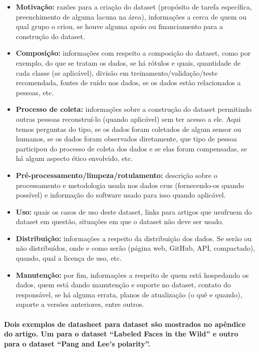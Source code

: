 \documentclass[a4paper]{article}    %
\begin{document}
\begin{itemize}
    \setlength\itemsep{0mm}
    \item \textbf{Motivação:} razões para a criação do dataset (propósito de tarefa específica, preenchimento de alguma lacuna na área), informações a cerca de quem ou qual grupo o criou, se houve alguma apoio ou financiamento para a construção do dataset.
    \item \textbf{Composição:} informações com respeito a composição do dataset, como por exemplo, do que se tratam os dados, se há rótulos e quais, quantidade de cada classe (se aplicável), divisão em treinamento/validação/teste recomendada, fontes de ruído nos dados, se os dados estão relacionados a pessoas, etc.
    \item \textbf{Processo de coleta:} informações sobre a construção do dataset permitindo outras pessoas reconstruí-lo (quando aplicável) sem ter acesso a ele. Aqui temos perguntas do tipo, se os dados foram coletados de algum sensor ou humanos, se os dados foram observados diretamente, que tipo de pessoa participou do processo de coleta dos dados e se elas foram compensadas, se há algum aspecto ético envolvido, etc.
    \item \textbf{Pré-processamento/limpeza/rotulamento:} descrição sobre o processamento e metodologia usada nos dados crus (fornecendo-os quando possível) e informação do software usado para isso quando aplicável.
    \item \textbf{Uso:} quais os casos de uso deste dataset, links para artigos que usufruem do dataset em questão, situações em que o dataset não deve ser usado.
    \item \textbf{Distribuição:} informações a respeito da distribuição dos dados. Se serão ou não distribuídos, onde e como serão (página web, GitHub, API, compactado), quando, qual a licença de uso, etc.
    \item \textbf{Manutenção:} por fim, informações a respeito de quem está hospedando os dados, quem está dando manutenção e suporte no dataset, contato do responsável, se há alguma errata, planos de atualização (o quê e quando), suporte a versões anteriores, entre outros.
\end{itemize}

\paragraph{Dois exemplos de datasheet para dataset são mostrados no apêndice do artigo. Um para o dataset ``Labeled Faces in the Wild'' e outro para o dataset  ``Pang and Lee’s polarity''.}
\end{document}
